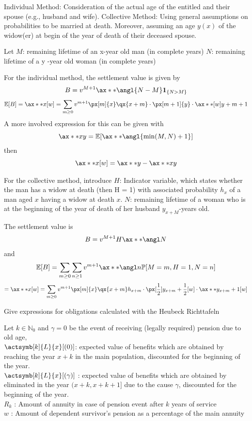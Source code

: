 \documentclass[11pt,a4paper,twoside]{article}
\begin{document}
Individual Method: Consideration of the actual age of the entitled and their spouse 
(e.g., husband and wife).
Collective Method: Using general assumptions on probabilities to be married at death. Moreover,
assuming an age \( y(x) \) of the widow(er) at begin of the year of death of their deceased spouse.

Let 
\( M \): remaining lifetime of an x-year old man (in complete years)
\( N \): remaining lifetime of a y -year old woman (in complete years)

For the individual method, the settlement value is given by
\[ B = v^{M+1} \ax**{\angl{N - M}} \mathbf{1}_{\{N > M\}} \]
\[ \mathbb{E}[B] = \ax**{x}[w] = \sum_{m \geq 0} v^{m+1} \px[m]{x} \qx{x + m} \cdot \px[m+1]{y} \cdot \ax**[w]{y + m + 1} \]
A more involved expression for this can be given with
\[ \ax**{xy} = \mathbb{E}[\ax**{\angl{\min(M, N) + 1}}]\]
then 
\[ \ax**{x}[w] = \ax**{y} - \ax**{xy} \]

For the collective method, introduce
\( H \): Indicator variable, which states whether the man has a widow at death (then H = 1)
with associated probability \( h_x \) of a man aged \( x \) having a widow at death \( x \).
\( N \): remaining lifetime of a woman who is at the beginning of the year of death of her husband
\( y_{x+M} \)-years old.

The settlement value is
\[ B = v^{M+1} H \ax**{\angl N} \]
and 
\[ \mathbb{E}[B] = \sum_{m \geq 0} \sum_{n \geq 1} v^{m+1} \ax**{\angl n} \mathbb{P}[M = m, H = 1, N = n] \]
\[ = \ax**{x}[w] = \sum_{m \geq 0} v^{m+1} \px[m]{x} \qx{x+m} h_{x+m} \cdot \px[\frac{1}{2}]{y_{x+m} + \frac{1}{2}}[w] \cdot \ax**{y_{x+m}+1}[w] \]


Give expressions for obligations calculated with the Heubeck Richttafeln

Let \(k \in \mathbb{N}_{0}\) and \( \gamma = 0 \) be the event of receiving (legally required) pension due to old age, \\
\( \actsymb[k]{L}{x}[(0)] \): expected value of benefits which are obtained by reaching the year \(x + k\) in the main
population, discounted for the beginning of the year. \\
\( \actsymb[k]{L}{x}[(\gamma)] \) : expected value of benefits which are obtained by eliminated in the year \((x + k, x + k + 1] \) 
due to the cause \(\gamma\), discounted for the beginning of the year. \\
\(R_k\) : Amount of annuity in case of pension event after \(k\) years of service \\
\(w\) : Amount of dependent survivor’s pension as a percentage of the main annuity \\
\end{document}
